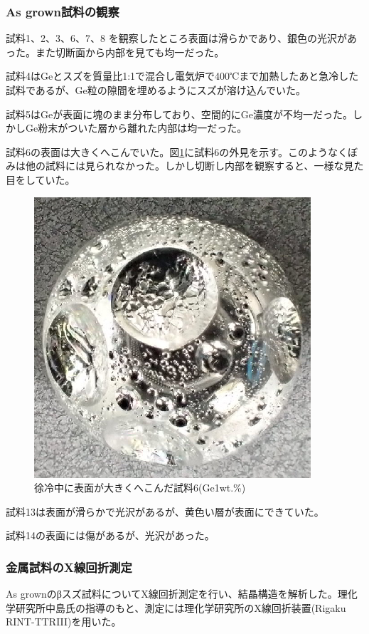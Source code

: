 \subsubsection{As grown試料の観察}
試料1、2、3、6、7、8%
を観察したところ表面は滑らかであり、銀色の光沢があった。また切断面から内部を見ても均一だった。

試料4はGeとスズを質量比1:1で混合し電気炉で400℃まで加熱したあと急冷した試料であるが、Ge粒の隙間を埋めるようにスズが溶け込んでいた。

試料5はGeが表面に塊のまま分布しており、空間的にGe濃度が不均一だった。しかしGe粉末がついた層から離れた内部は均一だった。

試料6の表面は大きくへこんでいた。図\ref{fig:sample6_asgrown}に試料6の外見を示す。このようなくぼみは他の試料には見られなかった。しかし切断し内部を観察すると、一様な見た目をしていた。
\begin{figure}[!h]
    \begin{center}
   \includegraphics[width=0.4\hsize]{samples/sample6_asgrown.eps}
  \end{center}
  \caption{徐冷中に表面が大きくへこんだ試料6(Ge1wt.\%)}
  \label{fig:sample6_asgrown}
\end{figure}

試料13は表面が滑らかで光沢があるが、黄色い層が表面にできていた。

試料14の表面には傷があるが、光沢があった。


\subsubsection{金属試料のX線回折測定}
As grownのβスズ試料についてX線回折測定を行い、結晶構造を解析した。理化学研究所中島氏の指導のもと、測定には理化学研究所のX線回折装置(Rigaku RINT-TTRI\hspace{-.1em}I\hspace{-.1em}I)を用いた。

